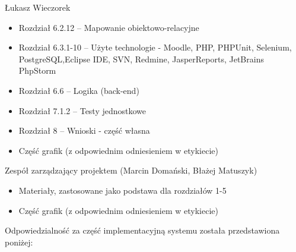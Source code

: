 \begin{description}
\item Łukasz Wieczorek

\begin{itemize}
\item Rozdział 6.2.12 -- Mapowanie obiektowo-relacyjne
\item Rozdział 6.3.1-10 -- Użyte technologie - Moodle, PHP, PHPUnit, Selenium, PostgreSQL,Eclipse IDE, SVN, Redmine, JasperReports, JetBrains PhpStorm
\item Rozdział 6.6 -- Logika (back-end)
\item Rozdział 7.1.2 -- Testy jednostkowe
\item Rozdział 8 -- Wnioski - część własna
\item Część grafik (z odpowiednim odniesieniem w etykiecie)
\end{itemize}
\noindent

\item Zespół zarządzający projektem (Marcin Domański, Błażej Matuszyk)

\begin{itemize}
\item Materiały\cite{Redmine:ProjDocs}, zastosowane jako podstawa dla rozdziałów 1-5
\item Część grafik (z odpowiednim odniesieniem w etykiecie)
\end{itemize}
\noindent

\end{description}
\noindent

Odpowiedzialność za część implementacyjną systemu została przedstawiona poniżej:

